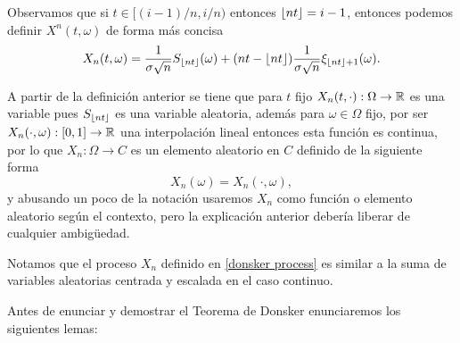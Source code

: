 \documentclass[12pt, letterpaper]{article}
\newcounter{lema}[section]
\numberwithin{equation}{section}
\begin{document}
Observamos que si $t\in [(i-1)/n,i/n)$ entonces $\lfloor nt\rfloor=i-1$, entonces podemos definir $X^n(t,\omega)$ de forma más concisa
\begin{equation}
    \label{donsker process}
    X_n(t,\omega)=\frac{1}{\sigma\sqrt{n}}S_{\lfloor nt\rfloor}(\omega)+(nt-\lfloor nt\rfloor)\frac{1}{\sigma\sqrt{n}}\xi_{\lfloor nt\rfloor+1}(\omega).
\end{equation}

A partir de la definición anterior se tiene que para $t$ fijo $X_n(t,\cdot):\Omega\to\R$ es una variable pues $S_{\lfloor nt\rfloor}$ es una variable aleatoria, además para $\omega \in\Omega$ fijo, por ser $X_n(\cdot,\omega):[0,1]\to\R$ una interpolación lineal entonces esta función es continua, por lo que $X_n:\Omega\to C$ es un elemento aleatorio en $C$ definido de la siguiente forma 
\[
    X_n(\omega)=X_n(\cdot,\omega),
\] 
y abusando un poco de la notación usaremos $X_n$ como función o elemento aleatorio según el contexto, pero la explicación anterior debería liberar de cualquier ambigüedad.

Notamos que el proceso $X_n$ definido en \eqref{donsker process} es similar a la suma de variables aleatorias centrada y escalada en el caso continuo. 

Antes de enunciar y demostrar el Teorema de Donsker enunciaremos los siguientes lemas:
\end{document}
